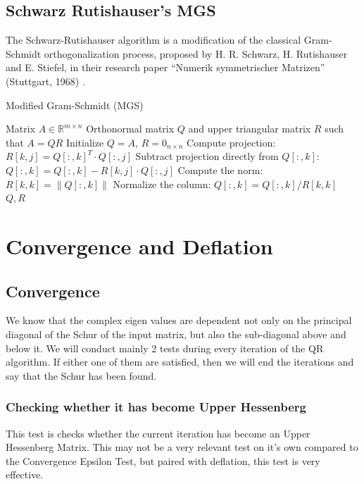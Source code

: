 \documentclass[12pt]{article}
\begin{document}
	\subsection{Schwarz Rutishauser's MGS} 
	The Schwarz-Rutishauser algorithm is a modification of the classical Gram-Schmidt orthogonalization process, proposed by H. R. Schwarz, H. Rutishauser and E. Stiefel, in their research paper “Numerik symmetrischer Matrizen” (Stuttgart, 1968) .  \cite{11}
	\begin{algorithm}
		\caption{Modified Gram-Schmidt (MGS)}
		\begin{algorithmic}[1]
			\Require Matrix \( A \in \mathbb{R}^{m \times n} \)
			\Ensure Orthonormal matrix \( Q \) and upper triangular matrix \( R \) such that \( A = QR \)
			\State Initialize \( Q = A \), \( R = 0_{n \times n} \)
			\State Compute projection: \( R[k,j] = Q[:,k]^T \cdot Q[:,j] \)
			\State Subtract projection directly from \( Q[:,k] \): \( Q[:,k] = Q[:,k] - R[k,j] \cdot Q[:,j] \)
			\EndFor
			\State Compute the norm: \( R[k,k] = \|Q[:,k]\| \)
			\State Normalize the column: \( Q[:,k] = Q[:,k] / R[k,k] \)
			\EndFor \\
			\Return \( Q, R \)
		\end{algorithmic}
	\end{algorithm}
	\newpage
	\section{Convergence and Deflation}
	\subsection{Convergence}
		We know that the complex eigen values are dependent not only on the principal diagonal of the Schur of the input matrix, but also the sub-diagonal above and below it. We will conduct mainly 2 tests during every iteration of the QR algorithm. If either one of them are satisfied, then we will end the iterations and say that the Schur has been found.
		\subsubsection{Checking whether it has become Upper Hessenberg}
		This test is checks whether the current iteration has become an Upper Hessenberg Matrix. This may not be a very relevant test on it's own compared to the Convergence Epsilon Test, but paired with deflation, this test is very effective.
\end{document}

